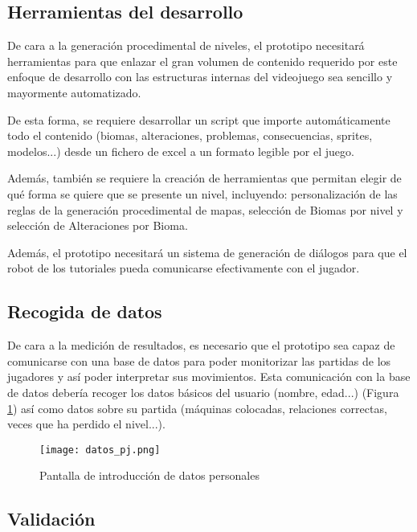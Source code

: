 \subsection{Herramientas del desarrollo}

De cara a la generación procedimental de niveles, el prototipo necesitará herramientas para que enlazar el gran volumen de contenido requerido por este enfoque de desarrollo con las estructuras internas del videojuego sea sencillo y mayormente automatizado. 

De esta forma, se requiere desarrollar un script que importe automáticamente todo el contenido (biomas, alteraciones, problemas, consecuencias, sprites, modelos...) desde un fichero de excel a un formato legible por el juego.

Además, también se requiere la creación de herramientas que permitan elegir de qué forma se quiere que se presente un nivel, incluyendo: personalización de las reglas de la generación procedimental de mapas, selección de Biomas por nivel y selección de Alteraciones por Bioma.

Además, el prototipo necesitará un sistema de generación de diálogos para que el robot de los tutoriales pueda comunicarse efectivamente con el jugador.

\subsection{Recogida de datos}

De cara a la medición de resultados, es necesario que el prototipo sea capaz de comunicarse con una base de datos para poder monitorizar las partidas de los jugadores y así poder interpretar sus movimientos. 
Esta comunicación con la base de datos debería recoger los datos básicos del usuario (nombre, edad...) (Figura \ref{fig:datos}) así como datos sobre su partida (máquinas colocadas, relaciones correctas, veces que ha perdido el nivel...).

\begin{figure}[H]
    \centering
      \texttt{[image: datos\_pj.png]}
    \caption{Pantalla de introducción de datos personales}
    \label{fig:datos}
\end{figure}

\subsection{Validación}

